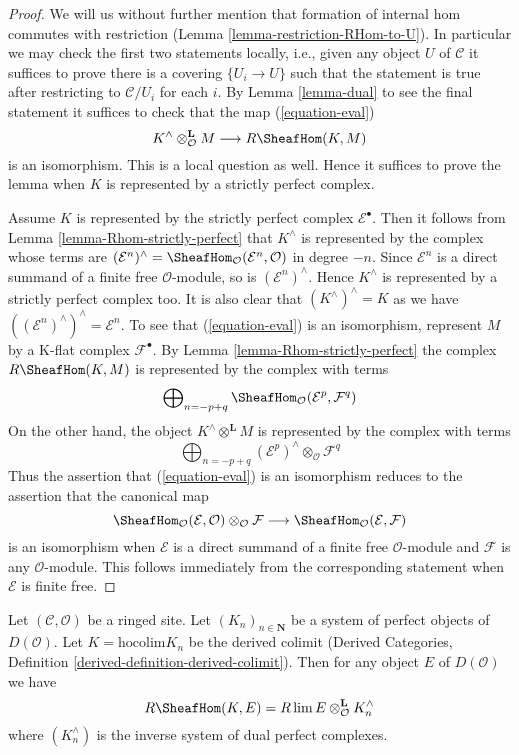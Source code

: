 \begin{proof}
We will us without further mention that formation of internal hom commutes
with restriction (Lemma \ref{lemma-restriction-RHom-to-U}).
In particular we may check the first two statements locally, i.e., given
any object $U$ of $\mathcal{C}$ it suffices to prove there is a covering
$\{U_i \to U\}$ such that the statement is true after restricting to
$\mathcal{C}/U_i$ for each $i$.
By Lemma \ref{lemma-dual} to see the final statement it suffices to check
that the map (\ref{equation-eval})
$$
K^\wedge \otimes^\mathbf{L}_\mathcal{O} M
\longrightarrow
R\SheafHom(K, M)
$$
is an isomorphism. This is a local question as well.
Hence it suffices to prove the lemma when $K$ is represented
by a strictly perfect complex.

\medskip\noindent
Assume $K$ is represented by the strictly perfect complex
$\mathcal{E}^\bullet$. Then it follows from
Lemma \ref{lemma-Rhom-strictly-perfect}
that $K^\wedge$ is represented by the complex whose terms are
$(\mathcal{E}^n)^\wedge =
\SheafHom_\mathcal{O}(\mathcal{E}^n, \mathcal{O})$
in degree $-n$. Since $\mathcal{E}^n$ is a direct summand of a finite
free $\mathcal{O}$-module, so is $(\mathcal{E}^n)^\wedge$.
Hence $K^\wedge$ is represented by a strictly perfect complex too.
It is also clear that $(K^\wedge)^\wedge = K$ as we have
$((\mathcal{E}^n)^\wedge)^\wedge = \mathcal{E}^n$.
To see that (\ref{equation-eval}) is an isomorphism, represent
$M$ by a K-flat complex $\mathcal{F}^\bullet$.
By Lemma \ref{lemma-Rhom-strictly-perfect} the complex
$R\SheafHom(K, M)$ is represented by the complex with terms
$$
\bigoplus\nolimits_{n = -p + q}
\SheafHom_\mathcal{O}(\mathcal{E}^p, \mathcal{F}^q)
$$
On the other hand, the object $K^\wedge \otimes^\mathbf{L} M$
is represented by the complex with terms
$$
\bigoplus\nolimits_{n = -p + q}
(\mathcal{E}^p)^\wedge \otimes_\mathcal{O} \mathcal{F}^q
$$
Thus the assertion that (\ref{equation-eval}) is an isomorphism
reduces to the assertion that the canonical map
$$
\SheafHom_\mathcal{O}(\mathcal{E}, \mathcal{O})
\otimes_\mathcal{O} \mathcal{F}
\longrightarrow
\SheafHom_\mathcal{O}(\mathcal{E}, \mathcal{F})
$$
is an isomorphism when $\mathcal{E}$ is a direct summand of a finite
free $\mathcal{O}$-module and $\mathcal{F}$ is any $\mathcal{O}$-module.
This follows immediately from the corresponding statement when
$\mathcal{E}$ is finite free.
\end{proof}

\begin{lemma}
\label{lemma-colim-and-lim-of-duals}
Let $(\mathcal{C}, \mathcal{O})$ be a ringed site. Let
$(K_n)_{n \in \mathbf{N}}$ be a system of perfect objects of $D(\mathcal{O})$.
Let $K = \text{hocolim} K_n$ be the derived colimit
(Derived Categories, Definition \ref{derived-definition-derived-colimit}).
Then for any object $E$ of $D(\mathcal{O})$ we have
$$
R\SheafHom(K, E) = R\lim E \otimes^\mathbf{L}_\mathcal{O} K_n^\wedge
$$
where $(K_n^\wedge)$ is the inverse system of dual perfect complexes.
\end{lemma}

